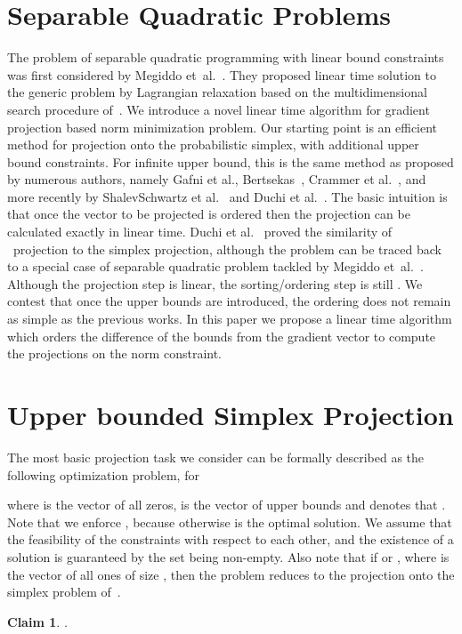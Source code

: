 \documentclass{article}
\newtheorem{claim}{Claim}
\def\etal{{et~al.}}
\def\Lo{~}
\begin{document}
\section{Separable Quadratic Problems}
The problem of separable quadratic programming with linear bound constraints was first considered by Megiddo \etal~\cite{Megiddo93}. They proposed linear time solution to the generic problem by Lagrangian relaxation based on the multidimensional search procedure of~\cite{Megiddo84}. We introduce a novel linear time algorithm for gradient projection based norm minimization problem. Our starting point is an efficient method for projection onto the probabilistic simplex, with additional upper bound constraints. For infinite upper bound, this is the same method as proposed by numerous authors, namely Gafni et al.\cite{Gafni84}, Bertsekas~\cite{Bertsekas99}, Crammer et al.~\cite{Crammer00}, and more recently by ShalevSchwartz et al.~\cite{ShalevShwartz06} and Duchi et al.~\cite{Duchi08}. The basic intuition is that once the vector to be projected is ordered then the projection can be calculated exactly in linear time. Duchi et al.~\cite{Duchi08} proved the similarity of \Lo projection to the simplex projection, although the problem can be traced back to a special case of separable quadratic problem tackled by Megiddo \etal~\cite{Megiddo93}. Although the projection step is linear, the sorting/ordering step is still . We contest that once the upper bounds are introduced, the ordering does not remain as simple as the previous works. In this paper we propose a linear time algorithm which orders the difference of the bounds from the gradient vector to compute the projections on the norm constraint.


\section{Upper bounded Simplex Projection}\label{SEC:UBSP}
The most basic projection task we consider can be formally described as the following optimization problem, for 

where  is the vector of all zeros,  is the vector of upper bounds and  denotes that .
Note that we enforce , because otherwise  is the optimal solution.
We assume that the feasibility of the constraints with respect to each other, and the existence of a solution is guaranteed by the set  being non-empty.
Also note that if  or , where  is the vector of all ones of size , then the problem reduces to the projection onto the simplex problem of~\cite{Duchi08}.
\begin{claim}\label{Claim:x_is less_than_v}
.
\end{claim}
\end{document}
